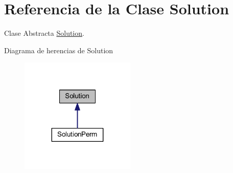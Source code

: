 \hypertarget{class_solution}{\section{Referencia de la Clase Solution}
\label{class_solution}
}


Clase Abstracta \hyperlink{class_solution}{Solution}.  




Diagrama de herencias de Solution
\nopagebreak
\begin{figure}[H]
\begin{center}
\leavevmode
\includegraphics[width=155pt]{class_solution__inherit__graph}
\end{center}
\end{figure}
